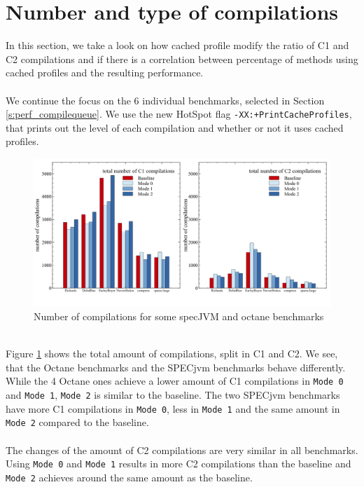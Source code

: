 \section{Number and type of compilations}
\label{s:perf_compilenumber}
In this section, we take a look on how cached profile modify the ratio of C1 and C2 compilations and if there is a correlation between percentage of methods using cached profiles and the resulting performance.
\\\\
We continue the focus on the 6 individual benchmarks, selected in Section \ref{s:perf_compilequeue}.
We use the new HotSpot flag \texttt{-XX:+PrintCacheProfiles}, that prints out the level of each compilation and whether or not it uses cached profiles.
\begin{figure}[ht!]
  \begin{center}
    \centering
    \includegraphics[width=1.0\textwidth]{figures/queue_total.png}
    \caption{Number of compilations for some specJVM and octane benchmarks}
    \label{f:queue_total}
  \end{center}
\end{figure}
\\
Figure \ref{f:queue_total} shows the total amount of compilations, split in C1 and C2.
We see, that the Octane benchmarks and the SPECjvm benchmarks behave differently. While the 4 Octane ones achieve a lower amount of C1 compilations in \texttt{Mode 0} and \texttt{Mode 1}, \texttt{Mode 2} is similar to the baseline. The two SPECjvm benchmarks have more C1 compilations in \texttt{Mode 0}, less in \texttt{Mode 1} and the same amount in \texttt{Mode 2} compared to the baseline.
\\\\
The changes of the amount of C2 compilations are very similar in all benchmarks. Using \texttt{Mode 0} and \texttt{Mode 1} results in more C2 compilations than the baseline and \texttt{Mode 2} achieves around the same amount as the baseline.
